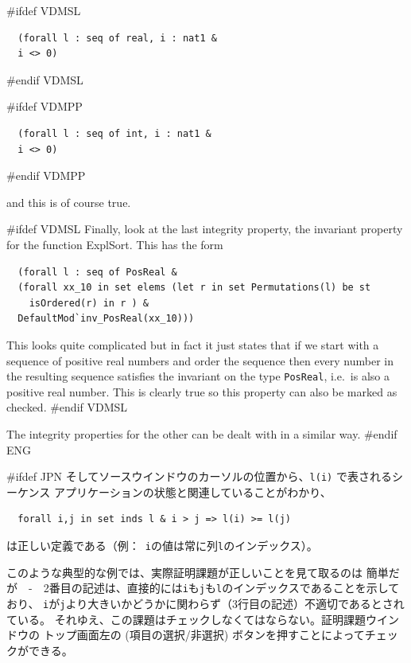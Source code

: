 \documentclass[\pformat,12pt]{article}
\newcommand{\aaa}{\tt }
\newcommand{\guicmd}[1]{{\sf #1}}
\newcommand{\guicmd}[1]{{\gt #1}}
\begin{document}
#ifdef VDMSL
\begin{verbatim}
  (forall l : seq of real, i : nat1 &
  i <> 0)
\end{verbatim}
#endif VDMSL

#ifdef VDMPP
\begin{verbatim}
  (forall l : seq of int, i : nat1 &
  i <> 0)
\end{verbatim}
#endif VDMPP

and this is of course true.

#ifdef VDMSL
Finally, look at the last integrity property, the invariant property
for the function \guicmd{ExplSort}. This has the form
\begin{verbatim}
  (forall l : seq of PosReal &
  (forall xx_10 in set elems (let r in set Permutations(l) be st 
    isOrdered(r) in r ) &
  DefaultMod`inv_PosReal(xx_10)))
\end{verbatim}

This looks quite complicated but in fact it just states that if we
start with a sequence of positive real numbers and order the sequence
then every number in the resulting sequence satisfies the invariant on
the type {\aaa PosReal}, i.e.\ is also a positive real number. This is
clearly true so this property can also be marked as checked.
#endif VDMSL

The integrity properties for the other
 can be dealt with in
a similar way.
#endif ENG

#ifdef JPN
そして\guicmd{ソースウインドウ}のカーソルの位置から、\verb+l(i)+ で表されるシーケンス
 アプリケーションの状態と関連していることがわかり、

\begin{verbatim}
  forall i,j in set inds l & i > j => l(i) >= l(j)
\end{verbatim}

は正しい定義である（例：\ {\aaa i}の値は常に列{\aaa l}のインデックス）。

このような典型的な例では、実際証明課題が正しいことを見て取るのは
簡単だが　-　2番目の記述は、直接的には{\aaa i}も{\aaa j}も{\aaa l}のインデックスであることを示しており、
{\aaa i}が{\aaa j}より大きいかどうかに関わらず（3行目の記述）不適切であるとされている。
それゆえ、この課題はチェックしなくてはならない。\guicmd{証明課題ウインドウ}の
トップ画面左の 
(\guicmd{項目の選択/非選択}) ボタンを押すことによってチェックができる。
\end{document}
